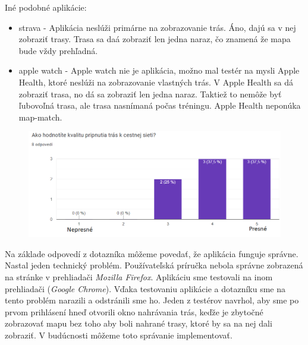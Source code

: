 \indent Iné podobné aplikácie:
\begin{itemize}
  \item strava - Aplikácia neslúži primárne na zobrazovanie trás. Áno, dajú sa v nej zobraziť trasy. Trasa sa daá zobraziť len jedna naraz, čo znamená že mapa bude vždy prehľadná.
  \item apple watch - Apple watch nie je aplikácia, možno mal testér na mysli Apple Health, ktoré neslúži na zobrazovanie vlastných trás. V Apple Health sa dá zobraziť trasa, no dá sa zobraziť len jedna naraz. Taktiež to nemôže byť ľubovoľná trasa, ale trasa nasnímaná počas tréningu. Apple Health neponúka map-match.
\end{itemize}
\begin{figure}[H]
  \centering
  \includegraphics[width=.7\textwidth]{img/dotaznik/11.png}
\end{figure}

Na základe odpovedí z dotazníka môžeme povedať, že aplikácia funguje správne. Nastal jeden technický problém. Používateľská príručka nebola správne zobrazená na stránke v prehliadači \textit{Mozilla Firefox}. Aplikáciu sme testovali na inom prehliadači (\textit{Google Chrome}). Vďaka testovaniu aplikácie a dotazníku sme na tento problém narazili a odstránili sme ho. Jeden z testérov navrhol, aby sme po prvom prihlásení hneď otvorili okno nahrávania trás, keďže je zbytočné zobrazovať mapu bez toho aby boli nahrané trasy, ktoré by sa na nej dali zobraziť. V budúcnosti môžeme toto správanie implementovať. 